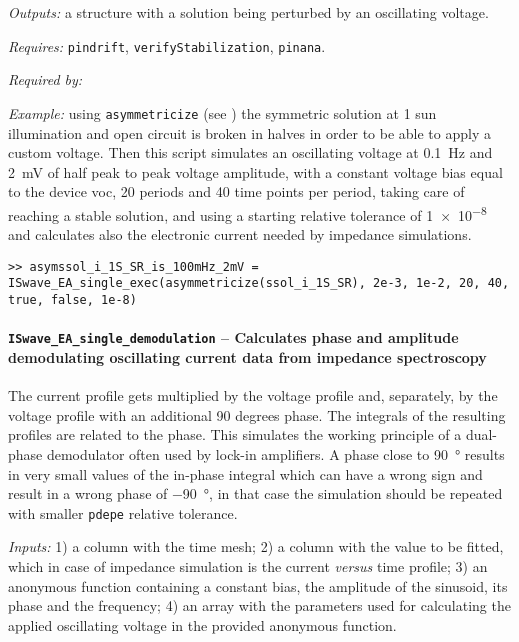 \textit{Outputs:} a structure with a solution being perturbed by an
     oscillating voltage.
     
     \textit{Requires:} \texttt{pindrift}, \texttt{verify\-Stabilization}, \texttt{pinana}.
     
     \textit{Required by:} 
     
   \textit{Example:} using \texttt{asymmetricize} (see ) the symmetric solution at 1 sun illumination and open circuit is broken in halves in order to be able to apply a custom voltage.
   Then this script simulates an oscillating voltage at \SI{0.1}{\Hz} and \SI{2}{\mV} of half peak to peak voltage amplitude, with a constant voltage bias equal to the device \gls{voc},
        20 periods and 40 time points per period, taking care of reaching a stable solution,
        and using a starting relative tolerance of \num{1e-8} and calculates also the electronic current needed by impedance simulations.
   \begin{lstlisting}[style=Matlab-editor]
>> asymssol_i_1S_SR_is_100mHz_2mV = ISwave_EA_single_exec(asymmetricize(ssol_i_1S_SR), 2e-3, 1e-2, 20, 40, true, false, 1e-8)
   \end{lstlisting}
		
		\paragraph{\texttt{ISwave\_EA\_single\_demodulation} -- Calculates phase and amplitude demodulating oscillating current data from impedance spectroscopy}\label{ISwave_EA_single_demodulation}
		The current profile gets multiplied by the voltage profile and,
		 separately, by the voltage profile with an additional 90 degrees phase.
		 The integrals of the resulting profiles are related to the phase.
		 This simulates the working principle of a dual-phase demodulator often
		 used by lock-in amplifiers.
		 A phase close to \SI{90}{\degree} results in very small values of
		 the in-phase integral which can have a wrong sign and result in a wrong phase of
		 \SI{-90}{\degree}, in that case the simulation should be repeated with smaller \texttt{pdepe}
		 relative tolerance.
		
		\textit{Inputs:} 1) a column with the time mesh;
		   2) a column with the value to be fitted, which in case of impedance simulation is the current \textsl{versus} time profile;
		   3) an anonymous function containing a constant bias, the amplitude of
		     the sinusoid, its phase and the frequency;
		   4) an array with the parameters used for calculating the applied
		     oscillating voltage in the provided anonymous function.
		
